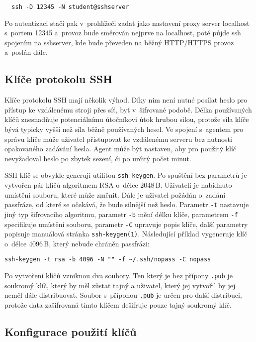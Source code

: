 \begin{verbatim}
  ssh -D 12345 -N student@sshserver
\end{verbatim}

Po autentizaci stačí pak v~prohlížeči zadat jako nastavení proxy server localhost s~portem 12345
 a~provoz bude směrován nejprve na localhost, poté půjde ssh spojením na sshserver, kde bude převeden
 na běžný HTTP/HTTPS provoz a~poslán dále. 

\subsection{Klíče protokolu SSH}

Klíče protokolu SSH mají několik výhod. Díky nim není nutné posílat heslo pro přístup ke vzdálenému
 stroji přes síť, byť v~šifrované podobě. Délka používaných klíčů znesnadňuje potenciálnímu
 útočníkovi útok hrubou silou, protože síla klíče bývá typicky vyšší než síla běžně používaných
 hesel. Ve spojení s~agentem pro správu klíče může uživatel přistupovat ke vzdálenému serveru bez
 nutnosti opakovaného zadávání hesla. Agent může být nastaven, aby pro použitý klíč nevyžadoval
 heslo po zbytek sezení, či po určitý počet minut.

SSH klíč se obvykle generují utilitou {\tt ssh-keygen}. Po spuštění bez parametrů je vytvořen pár
 klíčů algoritmem RSA o~délce 2048\,B. Uživateli je nabídnuto umístění souboru,
 které může změnit. Dále je uživatel požádán o~zadání passfráze, od které se očekává, že bude
 silnější než heslo. Parametr {\tt -t} nastavuje jiný typ šifrovacího algoritmu,
 parametr {\tt -b} mění délku klíče, parametrem {\tt -f} specifikuje umístění souboru, parametr
 {\tt -C} upravuje popis klíče, další parametry popisuje manuálová stránka {\tt ssh-keygen(1)}.
 Následující příklad vygeneruje klíč o~délce 4096\,B, který nebude chráněn passfrázi:

\begin{verbatim}
ssh-keygen -t rsa -b 4096 -N "" -f ~/.ssh/nopass -C nopass
\end{verbatim}

Po vytvoření klíčů vzniknou dva soubory. Ten který je bez přípony {\tt .pub} je soukromý klíč,
 který by měl zůstat tajný a uživatel, který jej vytvořil by jej neměl dále distribuovat.
 Soubor s~příponou {\tt .pub} je určen pro další distribuci, protože data zašifrovaná tímto
 klíčem dešifruje pouze tajný soukromý klíč.

\subsection{Konfigurace použití klíčů}

